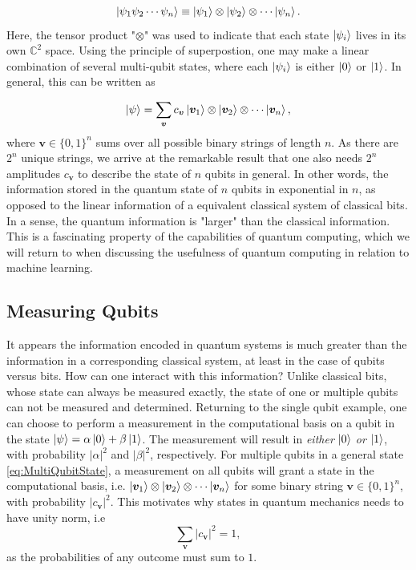 \begin{equation}\label{eq:tensorProductState}
\ket{\psi_1 \psi_2 \cdots \psi_n} \equiv \ket{\psi_1} \otimes \ket{\psi_2} \otimes \cdots \ket{\psi_n}.
\end{equation}
Here, the tensor product "$\otimes$" was used to indicate that each state $\ket{\psi_i}$ lives in its own $\mathbb{C}^2$ space. Using the principle of superpostion, one may make a linear combination of several multi-qubit states, where each $\ket{\psi_i}$ is either $\ket{0}$ or $\ket{1}$. In general, this can be written as

\begin{equation}\label{eq:MultiQubitState}
\ket{\psi} = \sum_{\boldsymbol{v}}c_{\boldsymbol{v}}\ket{\boldsymbol{v}_1} \otimes \ket{\boldsymbol{v}_2} \otimes \cdots \ket{\boldsymbol{v}_n},
\end{equation}
where $\boldsymbol{v} \in \{0,1\}^n$ sums over all possible binary strings of length $n$. As there are $2^n$ unique strings, we arrive at the remarkable result that one also needs $2^n$ amplitudes $c_{\boldsymbol{v}}$ to describe the state of $n$ qubits in general. In other words, the information stored in the quantum state of $n$ qubits in exponential in $n$, as opposed to the linear information of a equivalent classical system of classical bits. In a sense, the quantum information is "larger" than the classical information. This is a fascinating property of the  capabilities of quantum computing, which we will return to when discussing the usefulness of quantum computing in relation to machine learning.

\subsection{Measuring Qubits}\label{sec:MeasuringState}
It appears the information encoded in quantum systems is much greater than the information in a corresponding classical system, at least in the case of qubits versus bits. How can one interact with this information? Unlike classical bits, whose state can always be measured exactly, the state of one or multiple qubits can not be measured and determined. Returning to the single qubit example, one can choose to perform a measurement in the computational basis on a qubit in the state $\ket{\psi} = \alpha \ket{0} + \beta \ket{1}$. The measurement will result in  \emph{either} $\ket{0}$ \emph{or} $\ket{1}$, with probability $|\alpha|^2$ and $|\beta|^2$, respectively. For multiple qubits in a general state \autoref{eq:MultiQubitState}, a measurement on all qubits will grant a state in the computational basis, i.e. $\ket{\boldsymbol{v}_1} \otimes \ket{\boldsymbol{v}_2} \otimes \cdots \ket{\boldsymbol{v}_n}$ for some binary string $\boldsymbol{v} \in \{0,1\}^n$, with probability $|c_{\boldsymbol{v}}|^2$. This motivates why states in quantum mechanics needs to have unity norm, i.e
\begin{equation}\label{eq:MultiQubitState}
\sum_{\boldsymbol{v}}|c_{\boldsymbol{v}}|^2 = 1,
\end{equation} 
as the probabilities of any outcome must sum to $1$.

